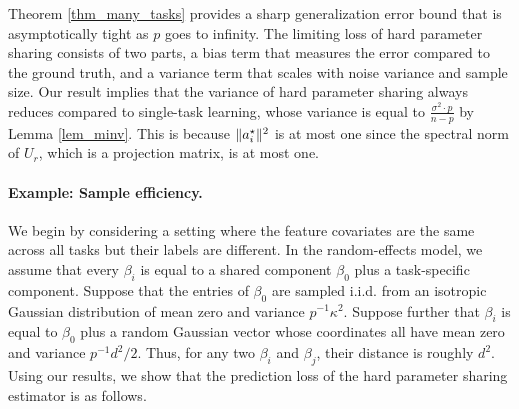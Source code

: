 	Theorem \ref{thm_many_tasks} provides a sharp generalization error bound that is asymptotically tight as $p$ goes to infinity.
	The limiting loss of hard parameter sharing consists of two parts, a bias term that measures the error compared to the ground truth, and a variance term that scales with noise variance and sample size.
	Our result implies that the variance of hard parameter sharing always reduces compared to single-task learning, whose variance is equal to $\frac{\sigma^2 \cdot p} {n - p}$ by Lemma \ref{lem_minv}.
	This is because $\|a_i^{\star}\|^2$ is at most one since the spectral norm of $U_r$, which is a projection matrix, is at most one.

\paragraph{Example: Sample efficiency.}
We begin by considering a setting where the feature covariates are the same across all tasks but their labels are different.
In the random-effects model, we assume that every $\beta_i$ is equal to a shared component $\beta_0$ plus a task-specific component.
Suppose that the entries of $\beta_0$ are sampled i.i.d. from an isotropic Gaussian distribution of mean zero and variance $p^{-1}\kappa^2$.
Suppose further that $\beta_i$ is equal to $\beta_0$ plus a random Gaussian vector whose coordinates all have mean zero and variance $p^{-1} d^2 / 2$.
Thus, for any two $\beta_i$ and $\beta_j$, their distance is roughly $d^2$.
Using our results, we show that the prediction loss of the hard parameter sharing estimator is as follows.

